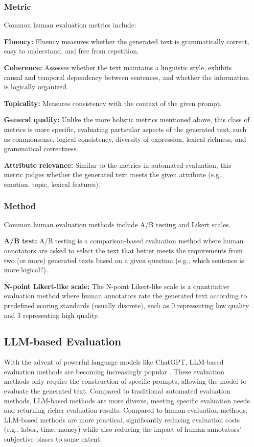 \documentclass[acmsmall, screen]{acmart}
\begin{document}
\subsubsection{\textbf{Metric}}
Common human evaluation metrics include:

\textbf{Fluency:} Fluency measures whether the generated text is grammatically correct, easy to understand, and free from repetition.

\textbf{Coherence:} Assesses whether the text maintains a linguistic style, exhibits causal and temporal dependency between sentences, and whether the information is logically organized.

\textbf{Topicality:} Measures consistency with the context of the given prompt.

\textbf{General quality:} Unlike the more holistic metrics mentioned above, this class of metrics is more specific, evaluating particular aspects of the generated text, such as commonsense, logical consistency, diversity of expression, lexical richness, and grammatical correctness.

\textbf{Attribute relevance:} Similar to the metrics in automated evaluation, this metric judges whether the generated text meets the given attribute (e.g., emotion, topic, lexical features).

\subsubsection{\textbf{Method}}
Common human evaluation methods include A/B testing and Likert scales.

\textbf{A/B test:} A/B testing is a comparison-based evaluation method where human annotators are asked to select the text that better meets the requirements from two (or more) generated texts based on a given question (e.g., which sentence is more logical?).

\textbf{N-point Likert-like scale:} The N-point Likert-like scale is a quantitative evaluation method where human annotators rate the generated text according to predefined scoring standards (usually discrete), such as 0 representing low quality and 3 representing high quality.

\subsection{LLM-based Evaluation}
With the advent of powerful language models like ChatGPT, LLM-based evaluation methods are becoming increasingly popular \cite{liu_arxiv24_ICV,dai_iclr24_SafeRLHF,li_arxiv24_DESTEIN,zhong_arxiv24_ROSE,wang_arxiv24_InferAligner,guo_arxiv24_ColdAttack,xia_arxiv24_fofo}. These evaluation methods only require the construction of specific prompts, allowing the model to evaluate the generated text. Compared to traditional automated evaluation methods, LLM-based methods are more diverse, meeting specific evaluation needs and returning richer evaluation results. Compared to human evaluation methods, LLM-based methods are more practical, significantly reducing evaluation costs (e.g., labor, time, money) while also reducing the impact of human annotators' subjective biases to some extent.
\end{document}
